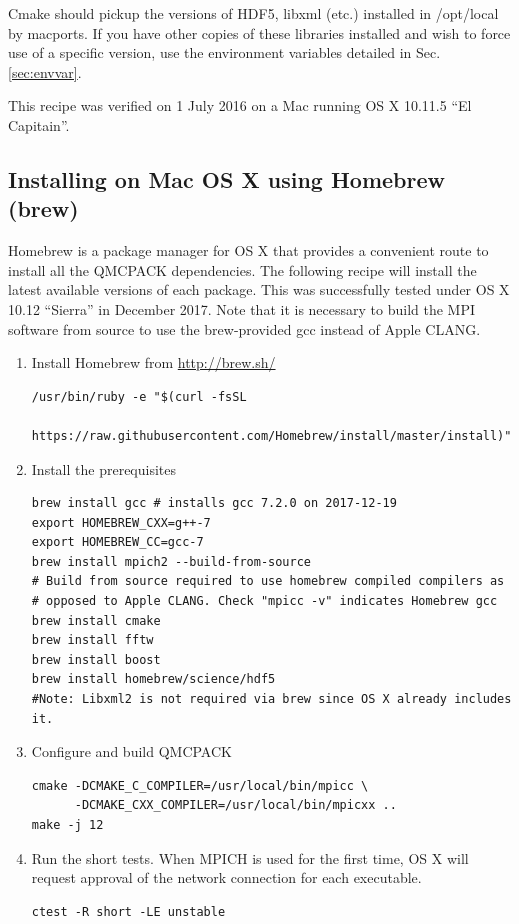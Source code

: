 Cmake should pickup the versions of HDF5, libxml (etc.) installed in
/opt/local by macports. If you have other copies of these libraries
installed and wish to force use of a specific version, use the
environment variables detailed in Sec. \ref{sec:envvar}.

This recipe was verified on 1 July 2016 on a Mac running OS X 10.11.5
``El Capitain''.

\subsection{Installing on Mac OS X using Homebrew (brew)}
Homebrew is a package manager for OS X that provides a convenient
route to install all the QMCPACK dependencies. The
following recipe will install the latest available versions of each
package. This was successfully tested under OS X 10.12 ``Sierra'' in December 2017. Note that it is necessary to build the MPI software from
source to use the brew-provided gcc instead of Apple CLANG.

\begin{enumerate}
\item Install Homebrew from \url{http://brew.sh/}
\verbatimfont{\footnotesize}%
\begin{verbatim}
/usr/bin/ruby -e "$(curl -fsSL
    https://raw.githubusercontent.com/Homebrew/install/master/install)"
\end{verbatim}

\item Install the prerequisites
\verbatimfont{\footnotesize}%
\begin{verbatim}
brew install gcc # installs gcc 7.2.0 on 2017-12-19
export HOMEBREW_CXX=g++-7
export HOMEBREW_CC=gcc-7
brew install mpich2 --build-from-source
# Build from source required to use homebrew compiled compilers as
# opposed to Apple CLANG. Check "mpicc -v" indicates Homebrew gcc
brew install cmake
brew install fftw
brew install boost
brew install homebrew/science/hdf5
#Note: Libxml2 is not required via brew since OS X already includes it.
\end{verbatim}
\item Configure and build QMCPACK
\verbatimfont{\footnotesize}%
\begin{verbatim}
cmake -DCMAKE_C_COMPILER=/usr/local/bin/mpicc \
      -DCMAKE_CXX_COMPILER=/usr/local/bin/mpicxx ..
make -j 12
\end{verbatim}
\item Run the short tests. When MPICH is used for the first time, OS
  X will request approval of the network connection for each executable.
\verbatimfont{\footnotesize}%
\begin{verbatim}
ctest -R short -LE unstable
\end{verbatim}
\end{enumerate}

